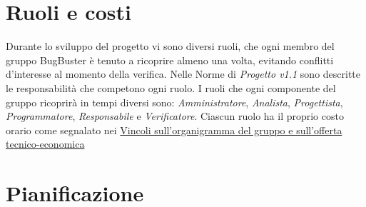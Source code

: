 \documentclass[11pt,a4paper]{book}
\begin{document}
\section{Ruoli e costi}
Durante lo sviluppo del progetto vi sono diversi ruoli, che ogni membro del gruppo BugBuster è tenuto a ricoprire almeno una volta, evitando conflitti d’interesse al momento della verifica. Nelle Norme di \textit{Progetto v1.1} sono descritte le responsabilità che competono ogni ruolo. I ruoli che ogni componente del gruppo ricoprirà in tempi diversi sono: \textit{Amministratore}, \textit{Analista}, \textit{Progettista}, \textit{Programmatore}, \textit{Responsabile} e \textit{Verificatore}.
Ciascun ruolo ha il proprio costo orario come segnalato nei 
\href{http://www.math.unipd.it/~tullio/IS-1/2015/Progetto/PD01b.html}{Vincoli sull’organigramma del gruppo e sull’offerta tecnico-economica}

\section{Pianificazione}
\end{document}
